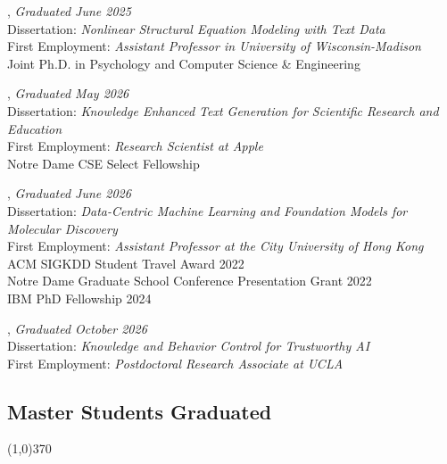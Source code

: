 \documentclass[10pt]{article}
\newenvironment{myindentpar}[1]%
{\begin{list}{}%
         {\setlength{\leftmargin}{#1}}%
         \item[]%
}
{\end{list}}
\newcounter{list}
\begin{document}
\begin{myindentpar}{0.75cm}
\hspace{-0.75cm}{\bf Lingbo Tong}, \textit{Graduated June 2025} \\
	{Dissertation: \textit{Nonlinear Structural Equation Modeling with Text Data}} \\
	{First Employment: \textit{Assistant Professor in University of Wisconsin-Madison}} \\
	{Joint Ph.D. in Psychology and Computer Science \& Engineering}

\hspace{-0.75cm}{\bf Mengxia Yu}, \textit{Graduated May 2026} \\
	{Dissertation: \textit{Knowledge Enhanced Text Generation for Scientific Research and Education}} \\
	{First Employment: \textit{Research Scientist at Apple}} \\
	{Notre Dame CSE Select Fellowship}

\hspace{-0.75cm}{\bf Gang Liu}, \textit{Graduated June 2026} \\
	{Dissertation: \textit{Data-Centric Machine Learning and Foundation Models for Molecular Discovery}} \\
	{First Employment: \textit{Assistant Professor at the City University of Hong Kong}} \\
	{ACM SIGKDD Student Travel Award 2022} \\
	{Notre Dame Graduate School Conference Presentation Grant 2022} \\
	{IBM PhD Fellowship 2024}

\hspace{-0.75cm}{\bf Zheyuan (Frank) Liu}, \textit{Graduated October 2026} \\
	{Dissertation: \textit{Knowledge and Behavior Control for Trustworthy AI}} \\
	{First Employment: \textit{Postdoctoral Research Associate at UCLA}}

\end{myindentpar}
	
\subsection{\sc Master Students Graduated}
\vspace{-0.4cm} \line(1,0){370} \vspace{-0.1cm}
\end{document}
